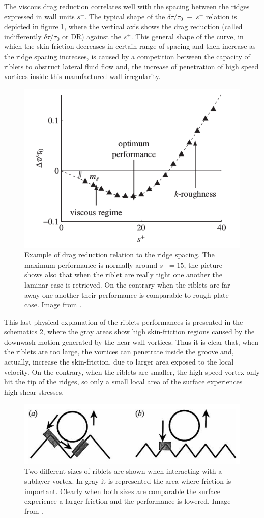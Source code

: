 The viscous drag reduction correlates well with the spacing between the ridges expressed in wall units $ s^+ $. The typical shape of the $\delta \tau/\tau_0 \; - \; s^+$ relation is depicted in figure \ref{fig:riblets_perf}, where the vertical axis shows the drag reduction (called indifferently $\delta \tau/\tau_0$ or DR) against the $s^+$.
This general shape of the curve, in which the skin friction decreases in certain range of spacing and then increase as the ridge spacing  increases, is caused by a competition between the capacity of riblets to obstruct lateral fluid flow and, the increase of penetration of high speed vortices inside this manufactured wall irregularity.

\begin{figure}[h]
	\centering
	\includegraphics[width=0.5\linewidth]{chapter_1/riblets_performance}
	\caption{Example of drag reduction relation to the ridge spacing. The maximum performance is normally around $ s^+ = 15 $, the picture shows also that when the riblet are really tight one another the laminar case is retrieved. On the contrary when the riblets are far away one another their performance is comparable to rough plate case. Image from \citet{jimenez2001turbulent}. }
	\label{fig:riblets_perf}
\end{figure}

This last physical explanation of the riblets performances is presented in the schematics \ref{fig:riblets_schem}, where the gray areas show high skin-friction regions caused by the downwash motion generated by the near-wall vortices.
Thus it is clear that, when the riblets are too large, the vortices can penetrate inside the groove and, actually, increase the skin-friction, due to larger area exposed to the local velocity.
On the contrary, when the riblets are smaller, the high speed vortex only hit the tip of the ridges, so only a small local area of the surface experiences high-shear stresses.

\begin{figure}[h]
	\centering
	\includegraphics[width=0.7\linewidth]{chapter_1/riblets1}
	\caption{Two different sizes of riblets are shown when interacting with a sublayer vortex. In gray it is represented the area where friction is important. Clearly when both sizes are comparable the surface experience a larger friction and the performance is lowered. Image from \citet{choi1993direct}.}
	\label{fig:riblets_schem}
\end{figure}

